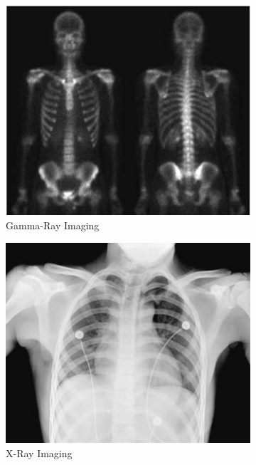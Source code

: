 \documentclass{amsproc}
\begin{document}
\begin{figure}[h]
\centering
\begin{subfigure}{.3\textwidth}
	\centering
	\includegraphics[scale=.25]{images/gamma.png}
	\caption{Gamma-Ray Imaging}
	\label{fig:sub5}
\end{subfigure} %
\begin{subfigure}{.3\textwidth}
	\centering
	\includegraphics[scale=.25]{images/xray.png}
	\caption{X-Ray Imaging}
	\label{fig:sub6}
\end{subfigure} %
\begin{subfigure}{.3\textwidth}

\end{subfigure}
\end{figure}
\end{document}
